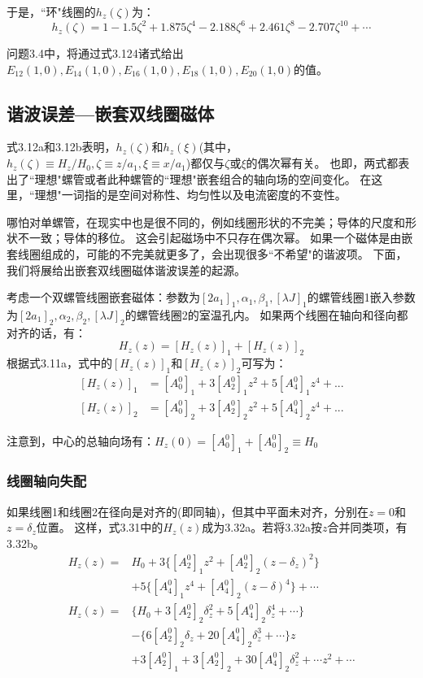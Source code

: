于是，``环"线圈的$h_z(\zeta)$为：
\begin{equation}
  h_z(\zeta)=1-1.5\zeta^2+1.875\zeta^4-2.188\zeta^6+2.461\zeta^8-2.707\zeta^{10}+\cdots
\end{equation}

问题3.4中，将通过式3.124诸式给出$E_{12}(1,0),E_{14}(1,0),E_{16}(1,0),E_{18}(1,0),E_{20}(1,0)$的值。

\subsection{谐波误差—嵌套双线圈磁体}
式3.12a和3.12b表明，$h_z(\zeta)$和$h_z(\xi)$(其中，$h_z(\zeta)\equiv H_z/H_0,\zeta\equiv z/a_1,\xi\equiv x/a_1$)都仅与$\zeta$或$\xi$的偶次幂有关。
也即，两式都表出了``理想"螺管或者此种螺管的``理想"嵌套组合的轴向场的空间变化。
在这里，``理想"一词指的是空间对称性、均匀性以及电流密度的不变性。

哪怕对单螺管，在现实中也是很不同的，例如线圈形状的不完美；导体的尺度和形状不一致；导体的移位。
这会引起磁场中不只存在偶次幂。
如果一个磁体是由嵌套线圈组成的，可能的不完美就更多了，会出现很多``不希望"的谐波项。
下面，我们将展给出嵌套双线圈磁体谐波误差的起源。

考虑一个双螺管线圈嵌套磁体：参数为$[2a_1]_1,\alpha_1,\beta_1,[\lambda J]_1$的螺管线圈1嵌入参数为$[2a_1]_2,\alpha_2,\beta_2,[\lambda J]_2$的螺管线圈2的室温孔内。
如果两个线圈在轴向和径向都对齐的话，有：
\begin{equation}
H_z(z)=[H_z(z)]_1+[H_z(z)]_2
\end{equation}
根据式3.11a，式中的$[H_z(z)]_1$和$[H_z(z)]_2$可写为：
\begin{subequations}
	\begin{align}
  [H_z(z)]_1 &= [A_0^0]_1 +3[A_2^0]_1 z^2+5[A_4^0]_1 z^4+... \\ 
  [H_z(z)]_2 &= [A_0^0]_2 +3[A_2^0]_2 z^2+5[A_4^0]_2 z^4+...
  \end{align}
\end{subequations}

注意到，中心的总轴向场有：$H_z(0)=[A_0^0]_1+[A_0^0]_2\equiv H_0$

\subsubsection{线圈轴向失配}
如果线圈1和线圈2在径向是对齐的(即同轴)，但其中平面未对齐，分别在$z=0$和$z=\delta_z$位置。
这样，式3.31中的$H_z(z)$成为3.32a。若将3.32a按$z$合并同类项，有3.32b。
\begin{subequations}
	\begin{align}
  H_z(z)=&H_0+3\{ [A_2^0]_1 z^2+[A_2^0]_2(z-\delta_z)^2\}\nonumber\\
  &+5\{[A_4^0]_1 z^4+[A_4^0]_2(z-\delta)^4\}+\cdots\\
H_z(z)=&\{H_0+3[A_2^0]_2 \delta_z^2+5[A_4^0]_2\delta_z^4+\cdots\}\nonumber\\
&-\{6[A_2^0]_2\delta_z+20[A_4^0]_2\delta_z^3+\cdots\}z\nonumber\\
&+{3[A_2^0]_1+3[A_2^0]_2+30[A_4^0]_2\delta_z^2+\cdots}z^2+\cdots
\end{align}
\end{subequations}

